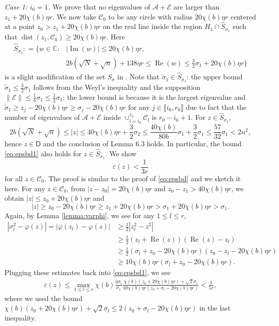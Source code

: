 \documentclass[reqno]{amsart}
\DeclareMathOperator{\dist}{dist}
\renewcommand\Re{\operatorname{Re}}
\renewcommand\Im{\operatorname{Im}}
\newcommand{\eps}{\varepsilon}
\theoremstyle{plain}
\theoremstyle{definition}
\begin{document}
\noindent\emph{Case 1: $i_0=1$.} We prove that no eigenvalues of $\mathcal A+\mathcal E$ are larger than $z_1+20\chi(b) \eta r$. We now take $\mathcal{C}_0$ to be any circle with radius $20\chi(b)  \eta r$ centered at a point $z_0>z_1+20\chi(b)\eta r$ on the real line inside the region $H_1 \cap \hat{S}_{\sigma_1}$ such that $\dist(z_1,\mathcal{C}_0) \geq 20\chi(b)  \eta r$.  Here 
\begin{align}\label{eq:modifiedS}
\hat{S}_{\sigma_1} : = \{w \in \mathbb{C} : &| \Im(w) | \leq 20\chi(b) \eta r, \nonumber\\
&2b(\sqrt N + \sqrt n)+138 \eta r \leq \Re(w) \leq \frac{3}{2}\sigma_1 +  20\chi(b) \eta r \}
\end{align}
 is a slight modification of the set ${S}_{\sigma}$ in \cite[Eq. (35)]{Wang24}. Note that $\widetilde{\sigma}_1 \in \hat{S}_{\sigma_1}$: the upper bound $\widetilde{\sigma}_1\le \frac{3}{2}\sigma_1$ follows from the Weyl's inequality and the supposition $\|\mathcal E\|\le \frac{1}{b}\sigma_1 \le \frac{1}{2}\sigma_1$; the lower bound is because it is the largest eigenvalue and $\widetilde{\sigma}_1 \ge z_j -20\chi(b) \eta r \ge \sigma_j -20\chi(b)\eta r$ for any $j\in \llbracket i_0, r_0 \rrbracket$ due to fact that the number of eigenvalues of $\mathcal A+ \mathcal E$ inside $\cup_{l=i_0}^{r_0} \mathcal{C}_l$ is $r_0-i_0+1$. For $z\in \hat{S}_{\sigma_1}$, $$2b(\sqrt N + \sqrt n)\le |z| \le 40\chi(b)\eta r +\frac{3}{2}\sigma_2 \le \frac{40\chi(b)}{80b}\sigma_1 + \frac{3}{2}\sigma_1 \le \frac{57}{32}\sigma_1 < 2n^2,$$ hence $z\in \mathsf D$ and the conclusion of Lemma 6.3 holds. In particular, the bound \eqref{eq:epsbd1} also holds for $z\in \hat{S}_{\sigma_1}$. 
 We show
\[ \eps(z) < \frac{1}{3r} \]
for all $z \in \mathcal{C}_0$.  The proof is similar to the proof of \eqref{eq:epsbd} and we sketch it here. For any $z \in \mathcal{C}_0$, from $|z-z_0|=20\chi(b) \eta r$  and $z_0-z_1 > 40\chi(b)  \eta r$, we obtain 
$|z| \le z_0 + 20\chi(b)  \eta r$ and $$|z| \ge z_0 - 20\chi(b)  \eta r \ge z_1 + 20\chi(b)  \eta r > \sigma_1 + 20\chi(b) \eta r > \sigma_1.$$ Again, by Lemma \ref{lemma:varphi}, we see for any $1\le l \le r$, 
\begin{align}\label{eq:onelastineq}
|\sigma_l^2 - \varphi(z)| = |\varphi(z_l) -\varphi(z)| &\ge \frac{1}{2} |z_l^2 - z^2| \nonumber\\
&\ge  \frac{1}{2} (z_l + \Re(z))(\Re(z) -z_l)\nonumber\\
&\ge \frac{1}{2}(\sigma_l + z_0 -20\chi(b) \eta r)(z_0-z_l -20\chi(b)\eta r) \nonumber\\
&\ge 10\chi(b) \eta r (\sigma_l + z_0 -20\chi(b)\eta r).
\end{align}
Plugging these estimates back into \eqref{eq:epsbd1}, we see
\begin{align*}
\eps(z) \le  \max_{1\le l \le r}\chi(b) \frac{\eta\sigma_l}{\sigma_1} \frac{\chi(b)(z_0 + 20\chi(b) \eta r) + \sqrt{2} \sigma_l}{10\chi(b)\eta r( z_0+\sigma_l -20\chi(b)\eta r)} < \frac{1}{5r},
\end{align*}
 where we used the bound $\chi(b)(z_0 + 20\chi(b) \eta r) + \sqrt{2} \sigma_l \le 2(z_0+\sigma_l -20\chi(b)\eta r)$ in the last inequality. 
\end{document}
